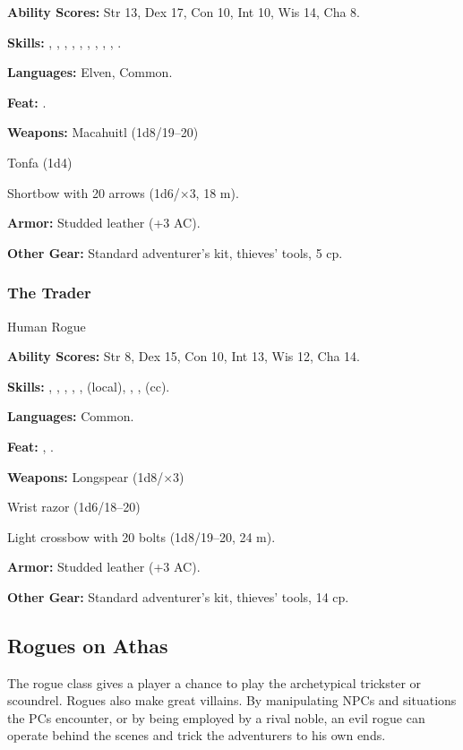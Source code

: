 \textbf{Ability Scores:} Str 13, Dex 17, Con 10, Int 10, Wis 14, Cha 8.

\textbf{Skills:} , , , , , , , , , .

\textbf{Languages:} Elven, Common.

\textbf{Feat:} .

\textbf{Weapons:} Macahuitl (1d8/19--20)

Tonfa (1d4)

Shortbow with 20 arrows (1d6/$\times$3, 18 m).

\textbf{Armor:} Studded leather (+3 AC).

\textbf{Other Gear:} Standard adventurer's kit, thieves' tools, 5 cp.

\subsubsection{The Trader}
Human Rogue

\textbf{Ability Scores:} Str 8, Dex 15, Con 10, Int 13, Wis 12, Cha 14.

\textbf{Skills:} , , , , ,  (local), , ,  (cc).

\textbf{Languages:} Common.

\textbf{Feat:} , .

\textbf{Weapons:} Longspear (1d8/$\times$3)

Wrist razor (1d6/18--20)

Light crossbow with 20 bolts (1d8/19--20, 24 m).

\textbf{Armor:} Studded leather (+3 AC).

\textbf{Other Gear:} Standard adventurer's kit, thieves' tools, 14 cp.

\subsection{Rogues on Athas}

The rogue class gives a player a chance to play the archetypical trickster or scoundrel. Rogues also make great villains. By manipulating NPCs and situations the PCs encounter, or by being employed by a rival noble, an evil rogue can operate behind the scenes and trick the adventurers to his own ends.

